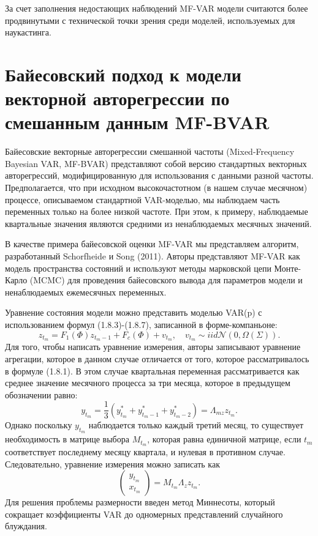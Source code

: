 \documentclass[a4paper, 14pt]{extreport}
\numberwithin{equation}{subsection}
\numberwithin{equation}{section}
\begin{document}
	За счет заполнения недостающих наблюдений MF-VAR модели считаются более продвинутыми с технической точки зрения среди моделей, используемых для наукастинга.
	\section{Байесовский подход к модели векторной авторегрессии по смешанным данным MF-BVAR}
	Байесовские векторные авторегрессии смешанной частоты (Mixed-Frequency Bayesian VAR, MF-BVAR) представляют собой версию стандартных векторных авторегрессий, модифицированную для использования с данными разной частоты. Предполагается, что при исходном высокочастотном (в нашем случае месячном) процессе, описываемом стандартной VAR-моделью, мы наблюдаем часть переменных только на более низкой частоте. При этом, к примеру, наблюдаемые квартальные значения являются средними из ненаблюдаемых месячных значений. 
	
	В качестве примера байесовской оценки MF-VAR мы представляем алгоритм, разработанный Schorfheide и Song (2011). Авторы представляют MF-VAR как
	модель пространства состояний и используют методы марковской цепи Монте-Карло (MCMC) для проведения байесовского вывода для
	параметров модели и ненаблюдаемых ежемесячных переменных. 
	
	Уравнение состояния модели можно представить моделью VAR(p) с использованием формул (1.8.3)-(1.8.7), записанной в форме-компаньоне: 
	\begin{equation}
		z_{t_m} = F_1(\Phi)z_{t_m - 1} + F_c(\Phi) + v_{t_m},\quad v_{t_m}\sim iid \mathcal{N}(0, \Omega(\Sigma)).
	\end{equation}
	Для того, чтобы написать уравнение измерения, авторы записывают уравнение агрегации, которое в данном случае отличается от того, которое рассматривалось в формуле (1.8.1). В этом случае квартальная переменная рассматривается как среднее значение месячного процесса за три месяца, которое в предыдущем обозначении равно:
	\begin{equation}
		y_{t_m} = \dfrac{1}{3}(y_{t_m}^* + y_{t_m-1}^* + y_{t_m-2}^*) = \Lambda_{mz} z_{t_m}.
	\end{equation}
	Однако поскольку $y_{t_m}$ наблюдается только каждый третий месяц, то существует необходимость в матрице выбора $M_{t_m}$, которая равна единичной матрице, если $t_m$ соответствует последнему месяцу квартала, и нулевая в противном случае. Следовательно, уравнение измерения можно записать как
	\begin{equation}
		\begin{pmatrix}
		y_{t_m}\\ x_{t_m}
	\end{pmatrix} = M_{t_m} \Lambda_z z_{t_m}.
	\end{equation}
	Для решения проблемы размерности введен метод Миннесоты, который сокращает коэффициенты VAR до одномерных представлений случайного блуждания.
\end{document}
